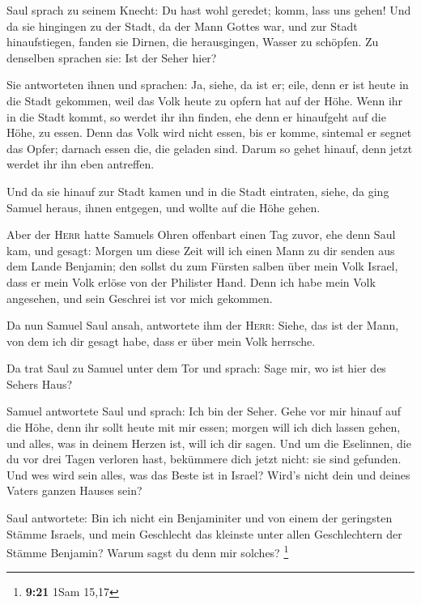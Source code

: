  Saul sprach zu seinem Knecht: Du hast wohl geredet;
komm, lass uns gehen! Und da sie hingingen zu der Stadt, da der Mann
Gottes war,  und zur Stadt hinaufstiegen, fanden sie
Dirnen, die herausgingen, Wasser zu schöpfen. Zu denselben sprachen sie:
Ist der Seher hier?

 Sie antworteten ihnen und sprachen: Ja, siehe, da ist
er; eile, denn er ist heute in die Stadt gekommen, weil das Volk heute
zu opfern hat auf der Höhe.  Wenn ihr in die Stadt kommt,
so werdet ihr ihn finden, ehe denn er hinaufgeht auf die Höhe, zu essen.
Denn das Volk wird nicht essen, bis er komme, sintemal er segnet das
Opfer; darnach essen die, die geladen sind. Darum so gehet hinauf, denn
jetzt werdet ihr ihn eben antreffen.

 Und da sie hinauf zur Stadt kamen und in die Stadt
eintraten, siehe, da ging Samuel heraus, ihnen entgegen, und wollte auf
die Höhe gehen.

 Aber der \textsc{Herr} hatte Samuels Ohren offenbart
einen Tag zuvor, ehe denn Saul kam, und gesagt:  Morgen
um diese Zeit will ich einen Mann zu dir senden aus dem Lande Benjamin;
den sollst du zum Fürsten salben über mein Volk Israel, dass er mein
Volk erlöse von der Philister Hand. Denn ich habe mein Volk angesehen,
und sein Geschrei ist vor mich gekommen.

 Da nun Samuel Saul ansah, antwortete ihm der
\textsc{Herr}: Siehe, das ist der Mann, von dem ich dir gesagt habe,
dass er über mein Volk herrsche.

 Da trat Saul zu Samuel unter dem Tor und sprach: Sage
mir, wo ist hier des Sehers Haus?

 Samuel antwortete Saul und sprach: Ich bin der Seher.
Gehe vor mir hinauf auf die Höhe, denn ihr sollt heute mit mir essen;
morgen will ich dich lassen gehen, und alles, was in deinem Herzen ist,
will ich dir sagen.  Und um die Eselinnen, die du vor
drei Tagen verloren hast, bekümmere dich jetzt nicht: sie sind gefunden.
Und wes wird sein alles, was das Beste ist in Israel? Wird's nicht dein
und deines Vaters ganzen Hauses sein?

 Saul antwortete: Bin ich nicht ein Benjaminiter und von
einem der geringsten Stämme Israels, und mein Geschlecht das kleinste
unter allen Geschlechtern der Stämme Benjamin? Warum sagst du denn mir
solches? \footnote{\textbf{9:21} 1Sam 15,17}

